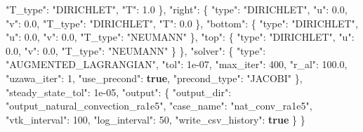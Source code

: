 \documentclass[
  10pt,
]{article}
\newenvironment{Shaded}{}{}
\newcommand{\DataTypeTok}[1]{\textcolor[rgb]{0.56,0.13,0.00}{#1}}
\newcommand{\DecValTok}[1]{\textcolor[rgb]{0.25,0.63,0.44}{#1}}
\newcommand{\FloatTok}[1]{\textcolor[rgb]{0.25,0.63,0.44}{#1}}
\newcommand{\FunctionTok}[1]{\textcolor[rgb]{0.02,0.16,0.49}{#1}}
\newcommand{\KeywordTok}[1]{\textcolor[rgb]{0.00,0.44,0.13}{\textbf{#1}}}
\newcommand{\StringTok}[1]{\textcolor[rgb]{0.25,0.44,0.63}{#1}}
\begin{document}
\begin{Shaded}
\begin{Highlighting}[]
      \DataTypeTok{"T\_type"}\FunctionTok{:} \StringTok{"DIRICHLET"}\FunctionTok{,}
      \DataTypeTok{"T"}\FunctionTok{:} \FloatTok{1.0}
    \FunctionTok{\},}
    \DataTypeTok{"right"}\FunctionTok{:} \FunctionTok{\{}
      \DataTypeTok{"type"}\FunctionTok{:} \StringTok{"DIRICHLET"}\FunctionTok{,}
      \DataTypeTok{"u"}\FunctionTok{:} \FloatTok{0.0}\FunctionTok{,}
      \DataTypeTok{"v"}\FunctionTok{:} \FloatTok{0.0}\FunctionTok{,}
      \DataTypeTok{"T\_type"}\FunctionTok{:} \StringTok{"DIRICHLET"}\FunctionTok{,}
      \DataTypeTok{"T"}\FunctionTok{:} \FloatTok{0.0}
    \FunctionTok{\},}
    \DataTypeTok{"bottom"}\FunctionTok{:} \FunctionTok{\{}
      \DataTypeTok{"type"}\FunctionTok{:} \StringTok{"DIRICHLET"}\FunctionTok{,}
      \DataTypeTok{"u"}\FunctionTok{:} \FloatTok{0.0}\FunctionTok{,}
      \DataTypeTok{"v"}\FunctionTok{:} \FloatTok{0.0}\FunctionTok{,}
      \DataTypeTok{"T\_type"}\FunctionTok{:} \StringTok{"NEUMANN"}
    \FunctionTok{\},}
    \DataTypeTok{"top"}\FunctionTok{:} \FunctionTok{\{}
      \DataTypeTok{"type"}\FunctionTok{:} \StringTok{"DIRICHLET"}\FunctionTok{,}
      \DataTypeTok{"u"}\FunctionTok{:} \FloatTok{0.0}\FunctionTok{,}
      \DataTypeTok{"v"}\FunctionTok{:} \FloatTok{0.0}\FunctionTok{,}
      \DataTypeTok{"T\_type"}\FunctionTok{:} \StringTok{"NEUMANN"}
    \FunctionTok{\}}
  \FunctionTok{\},}
  \DataTypeTok{"solver"}\FunctionTok{:} \FunctionTok{\{}
    \DataTypeTok{"type"}\FunctionTok{:} \StringTok{"AUGMENTED\_LAGRANGIAN"}\FunctionTok{,}
    \DataTypeTok{"tol"}\FunctionTok{:} \DecValTok{1e{-}07}\FunctionTok{,}
    \DataTypeTok{"max\_iter"}\FunctionTok{:} \DecValTok{400}\FunctionTok{,}
    \DataTypeTok{"r\_al"}\FunctionTok{:} \FloatTok{100.0}\FunctionTok{,}
    \DataTypeTok{"uzawa\_iter"}\FunctionTok{:} \DecValTok{1}\FunctionTok{,}
    \DataTypeTok{"use\_precond"}\FunctionTok{:} \KeywordTok{true}\FunctionTok{,}
    \DataTypeTok{"precond\_type"}\FunctionTok{:} \StringTok{"JACOBI"}
  \FunctionTok{\},}
  \DataTypeTok{"steady\_state\_tol"}\FunctionTok{:} \DecValTok{1e{-}05}\FunctionTok{,}
  \DataTypeTok{"output"}\FunctionTok{:} \FunctionTok{\{}
    \DataTypeTok{"output\_dir"}\FunctionTok{:} \StringTok{"output\_natural\_convection\_ra1e5"}\FunctionTok{,}
    \DataTypeTok{"case\_name"}\FunctionTok{:} \StringTok{"nat\_conv\_ra1e5"}\FunctionTok{,}
    \DataTypeTok{"vtk\_interval"}\FunctionTok{:} \DecValTok{100}\FunctionTok{,}
    \DataTypeTok{"log\_interval"}\FunctionTok{:} \DecValTok{50}\FunctionTok{,}
    \DataTypeTok{"write\_csv\_history"}\FunctionTok{:} \KeywordTok{true}
  \FunctionTok{\}}
\FunctionTok{\}}
\end{Highlighting}
\end{Shaded}
\end{document}
